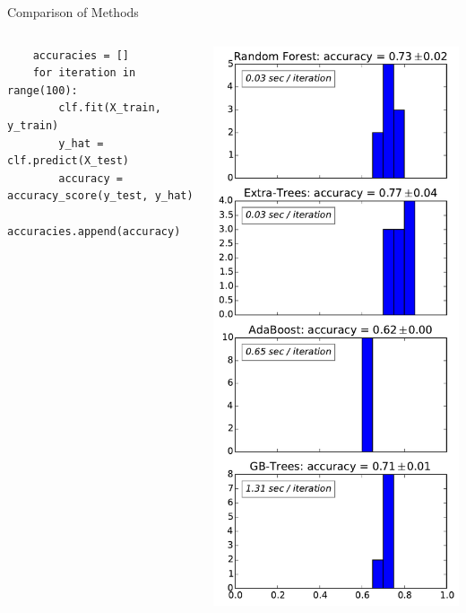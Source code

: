 \documentclass[10pt, aspectratio=169]{beamer} %
\begin{document}
\begin{frame}[fragile]{Comparison of Methods}
\begin{columns}
\begin{lstlisting}
    accuracies = []    
    for iteration in range(100):        
        clf.fit(X_train, y_train)
        y_hat = clf.predict(X_test)
        accuracy = accuracy_score(y_test, y_hat)
        accuracies.append(accuracy)
\end{lstlisting}
\centerline{\includegraphics[width = \textwidth]{EnsembleComparison.pdf}}
\end{columns}
\end{frame}
\end{document}

